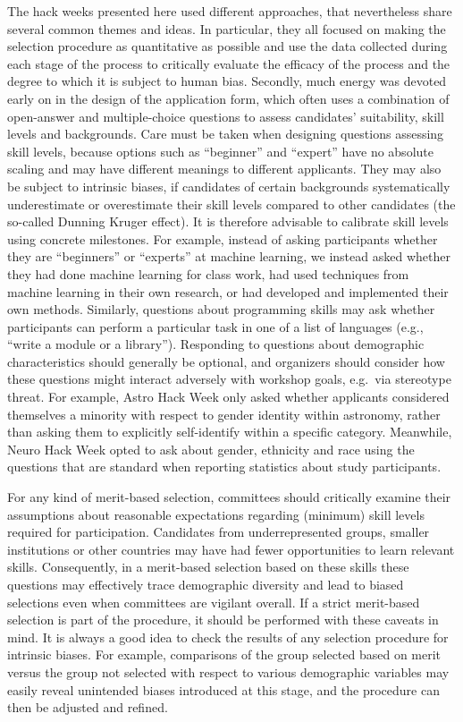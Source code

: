 \documentclass{aastex62}
\begin{document}
The hack weeks presented here used different approaches, that nevertheless share several common themes and ideas. In particular, they all focused on making the selection procedure as quantitative as possible and use the data collected during each stage of the process to critically evaluate the efficacy of the process and  the degree to which it is subject to human bias.
Secondly, much energy was devoted early on in the design of the application form, which often uses a combination of open-answer and multiple-choice questions to assess candidates' suitability, skill levels and backgrounds. Care must be taken when designing questions assessing skill levels, because options such as ``beginner'' and ``expert'' have no absolute scaling and may have different meanings to different applicants. They may also be subject to intrinsic biases, if candidates of certain backgrounds systematically underestimate or overestimate their skill levels compared to other candidates (the so-called Dunning Kruger effect). It is therefore advisable to calibrate skill levels using concrete milestones. For example, instead of asking participants whether they are ``beginners'' or ``experts'' at machine learning, we instead asked whether they had done machine learning for class work, had used techniques from machine learning in their own research, or had developed and implemented their own methods. Similarly, questions about programming skills may ask whether participants can perform a particular task in one of a list of languages (e.g., ``write a module or a library'').
Responding to questions about demographic characteristics should generally be optional, and organizers should consider how these questions might interact adversely with workshop goals, e.g.\ via stereotype threat. For example, Astro Hack Week only asked whether applicants considered themselves a minority with respect to gender identity within astronomy, rather than asking them to explicitly self-identify within a specific category. Meanwhile, Neuro Hack Week opted to ask about gender, ethnicity and race using the questions that are standard when reporting statistics about study participants.

 For any kind of merit-based selection, committees should critically examine their assumptions about reasonable expectations regarding (minimum) skill levels required for participation. Candidates from underrepresented groups, smaller institutions or other countries may have had fewer opportunities to learn relevant skills. Consequently, in a merit-based selection based on these skills these questions may effectively trace demographic diversity and lead to biased selections even when committees are vigilant overall. If a strict merit-based selection is part of the procedure, it should be performed with these caveats in mind. It is always a good idea to check the results of any selection procedure for intrinsic biases. For example, comparisons of the group selected based on merit versus the group not selected with respect to various demographic variables may easily reveal unintended biases introduced at this stage, and the procedure can then be adjusted and refined.
\end{document}
